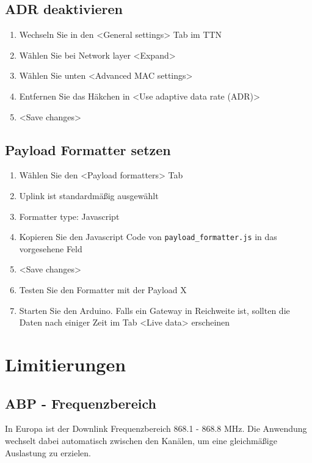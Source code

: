 \documentclass[12pt]{article}
\begin{document}
    \subsection{ADR deaktivieren} \label{subsec:ADR deaktivieren}
      \begin{enumerate}
        \item Wechseln Sie in den \textless General settings\textgreater{} Tab im TTN
        \item Wählen Sie bei Network layer \textless Expand\textgreater{}
        \item Wählen Sie unten \textless Advanced MAC settings\textgreater{}
        \item Entfernen Sie das Häkchen in \textless Use adaptive data rate (ADR)\textgreater{}
        \item \textless Save changes\textgreater{}
      \end{enumerate}


    
    \subsection{Payload Formatter setzen} \label{subsec:Payload Formatter setzen}
    \begin{enumerate}
      \item Wählen Sie den \textless Payload formatters\textgreater{} Tab
      \item Uplink ist standardmäßig ausgewählt
      \item Formatter type: Javascript
      \item Kopieren Sie den Javascript Code von \texttt{payload\_formatter.js} in das vorgesehene Feld
      \item \textless Save changes\textgreater{}
      \item Testen Sie den Formatter mit der Payload X %
      \item Starten Sie den Arduino. Falls ein Gateway in Reichweite ist, sollten die Daten nach einiger
        Zeit im Tab \textless Live data\textgreater{} erscheinen
    \end{enumerate}



  \section{Limitierungen}

      \subsection{ABP - Frequenzbereich} \label{subsec:ABP - Frequenzbereich}
        In Europa ist der Downlink Frequenzbereich 868.1 - 868.8 MHz.
        Die Anwendung wechselt dabei automatisch zwischen den Kanälen, um eine gleichmäßige Auslastung zu erzielen.
\end{document}
